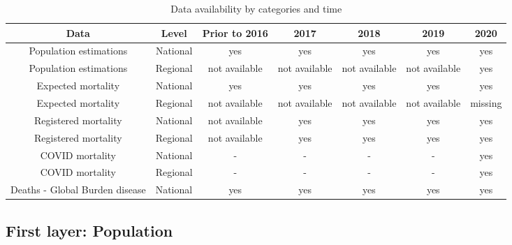 \documentclass[
]{article}
\begin{document}
\begin{table}[H]
  \centering
   \caption{Data availability by categories and time} \label{tab:data}
    \begin{tabular}{ccccccc}\toprule
Data                                                 & Level                            & Prior to 2016 & 2017          & 2018          & 2019          & 2020    \\ \midrule
Population estimations                                          & National                       & yes           & yes           & yes           & yes           & yes     \\ 
Population estimations                                           & Regional                     & not available & not available & not available & not available & yes     \\ 
Expected mortality                                   & National                       & yes           & yes           & yes           & yes           & yes     \\ 
Expected mortality                                   & Regional                       & not available & not available & not available & not available & missing \\ 
Registered mortality                                 & National                      & not available & yes           & yes           & yes           & yes     \\ 
Registered mortality                                 & Regional                     & not available & yes           & yes           & yes           & yes     \\ 
COVID mortality                                      & National                      & -             & -             & -             & -             & yes     \\ 
COVID mortality                                      & Regional                    & -             & -             & -             & -             & yes     \\ 
\multicolumn{1}{l}{Deaths - Global Burden disease} & \multicolumn{1}{l}{National} & yes           & yes           & yes           & yes           & yes     \\ \bottomrule
\end{tabular}
\end{table}

\hypertarget{first-layer-population}{%
\subsection{First layer: Population}\label{first-layer-population}}
\end{document}
